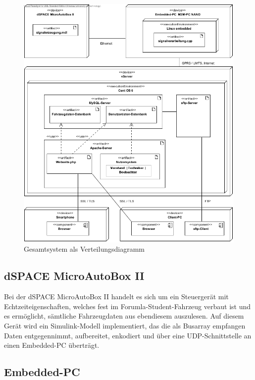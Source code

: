 \documentclass[fontsize = 12pt, paper = a4]{scrreprt}
\begin{document}
\begin{figure}[h]
\centering
\includegraphics[scale = 0.7]{verteilungsdiagramm.png}
\caption{Gesamtsystem als Verteilungsdiagramm}
\end{figure}

\subsection{dSPACE MicroAutoBox II}

Bei der dSPACE MicroAutoBox II handelt es sich um ein Steuergerät mit Echtzeiteigenschaften, welches fest im Forumla-Student-Fahrzeug verbaut ist und es ermöglicht, sämtliche Fahrzeugdaten aus ebendiesem auszulesen. Auf diesem Gerät wird ein Simulink-Modell implementiert, das die als Busarray empfangen Daten entgegennimmt, aufbereitet, enkodiert und über eine UDP-Schnittstelle an einen Embedded-PC überträgt. 

\subsection{Embedded-PC}
\end{document}
